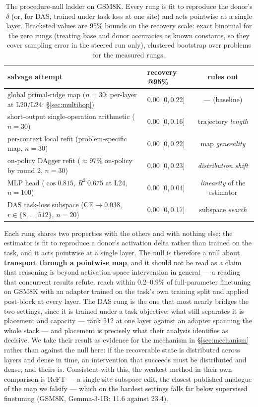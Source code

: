 \documentclass{article}
\newcommand{\ci}[2]{{[#1,\,#2]}}
\begin{document}
\begin{table}[t]
\centering
\caption{The procedure-null ladder on GSM8K. Every rung is fit to reproduce the donor's $\delta$
(or, for DAS, trained under task loss at one site) and acts pointwise at a single layer. Bracketed
values are 95\% bounds on the recovery scale: exact binomial for the zero rungs (treating base and
donor accuracies as known constants, so they cover sampling error in the steered run only),
clustered bootstrap over problems for the measured rungs.}
\label{tab:ladder}
\small
\begin{tabular}{llc}
\toprule
salvage attempt & recovery @95\% & rules out \\
\midrule
global primal-ridge map ($n{=}30$; per-layer at L20/L24: \S\ref{sec:multihop}) & 0.00 \ci{0}{0.22} & --- (baseline) \\
short-output single-operation arithmetic ($n{=}30$) & 0.00 \ci{0}{0.16} & trajectory \emph{length} \\
per-context local refit (problem-specific map, $n{=}30$) & 0.00 \ci{0}{0.22} & map \emph{generality} \\
on-policy DAgger refit (${\approx}97\%$ on-policy by round 2, $n{=}30$) \citep{ross2011dagger} & 0.00 \ci{0}{0.23} & \emph{distribution shift} \\
MLP head ($\cos 0.815$, $R^2\ 0.675$ at L24, $n{=}100$) & 0.00 \ci{0}{0.04} & \emph{linearity} of the estimator \\
DAS task-loss subspace (CE${\to}0.038$, $r{\in}\{8,\dots,512\}$, $n{=}20$) \citep{geiger2024das} & 0.00 \ci{0}{0.17} & subspace \emph{search} \\
\bottomrule
\end{tabular}
\end{table}

Each rung shares two properties with the others and with nothing else: the estimator is fit to
reproduce a donor's activation delta rather than trained on the task, and it acts pointwise at a
single layer. The null is therefore a null about \textbf{transport through a pointwise map}, and it
should not be read as a claim that reasoning is beyond activation-space intervention in general ---
a reading that concurrent results refute. \citet{adila2026weightshifts} reach within 0.2--0.9\% of
full-parameter finetuning on GSM8K with an adapter trained on the task's own training split and
applied post-block at every layer. The DAS rung is the one that most nearly bridges the two
settings, since it is trained under a task objective; what still separates it is placement and
capacity --- rank 512 at one layer against an adapter spanning the whole stack --- and placement is
precisely what their analysis identifies as decisive. We take their result as evidence for the
mechanism in \S\ref{sec:mechanism} rather than against the null here: if the recoverable state is
distributed across layers and dense in time, an intervention that succeeds must be distributed and
dense, and theirs is. Consistent with this, the weakest method in their own comparison is ReFT ---
a single-site subspace edit, the closest published analogue of the map we falsify --- which on the
hardest settings falls far below supervised finetuning (GSM8K, Gemma-3-1B: 11.6 against 23.4).
\end{document}
